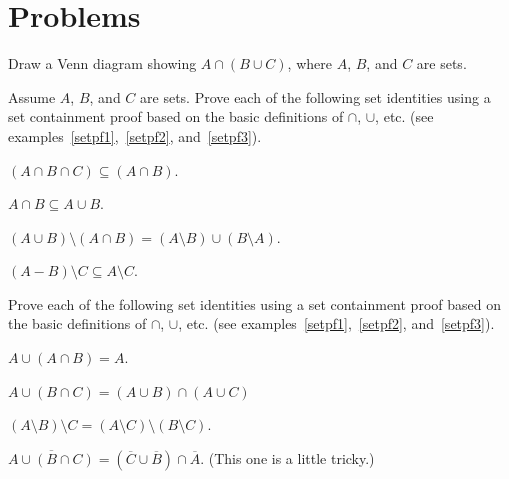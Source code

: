 \section{Problems}

\begin{pro}
Draw a Venn diagram showing $A\cap(B\cup C)$, where $A$, $B$, and $C$
are sets.
\end{pro}



\begin{pro}
Assume $A$, $B$, and $C$ are sets.
Prove each of the following set identities using a set containment proof based on the basic definitions
of $\cap$, $\cup$, etc. (see examples~\ref{setpf1},~\ref{setpf2}, and~\ref{setpf3}).
\begin{lenum}
\item
$(A\cap B\cap C) \subseteq (A\cap B)$.
\item 
$A\cap B \subseteq A\cup B$.
\item 
$(A\cup B)\setminus(A\cap B) = (A\setminus B)\cup(B\setminus A)$.
\item 
$(A-B)\setminus C \subseteq A\setminus C$.
\end{lenum}
\end{pro}

\begin{pro}
Prove each of the following set identities using a set containment proof based on the basic definitions
of $\cap$, $\cup$, etc. (see examples~\ref{setpf1},~\ref{setpf2}, and~\ref{setpf3}).
\begin{lenum}
\item
$A\cup(A\cap B)=A$.
\item
$A\cup (B\cap C) = (A\cup B)\cap(A\cup C)$
\item
$(A\setminus B)\setminus C=(A\setminus C)\setminus (B\setminus C)$.
\item
$\overline{A\cup(B\cap C)}=(\overline{C}\cup\overline{B})\cap\overline{A}$. (This one is a little tricky.)
\end{lenum}
\end{pro}


